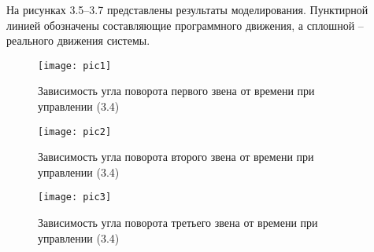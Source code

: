  На рисунках 3.5–3.7 представлены результаты моделирования. Пунктирной линией обозначены  составляющие программного движения, а сплошной – реального движения системы.
 
 
  \begin{figure}[H]
  	\centering
  	\texttt{[image: pic1]}
  	\caption{Зависимость угла поворота первого звена от времени при управлении (3.4) }
  	\label{fig:manip2}
  \end{figure}
  
  \begin{figure}[H]
    	\centering
    	\texttt{[image: pic2]}
    	\caption{Зависимость угла поворота второго звена от времени при управлении (3.4)  }
    	\label{fig:manip2}
    \end{figure}
    
      \begin{figure}[H]
      	\centering
      	\texttt{[image: pic3]}
      	\caption{Зависимость угла поворота третьего звена от времени при управлении (3.4) }
      	\label{fig:manip2}
      \end{figure}